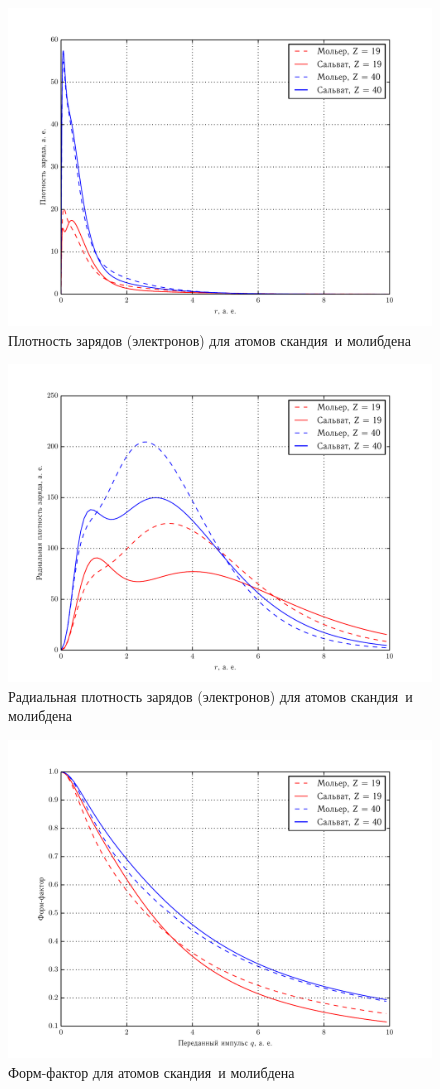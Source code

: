 \documentclass[10pt,pscyr]{hedlab}
\newcommand{\fiat}{скандия~}
\newcommand{\seat}{молибдена~}
\begin{document}
  \begin{figure}[h!]
    \centering
    \includegraphics[width=.7\textwidth]{density}
    \caption{Плотность зарядов (электронов) для атомов
      \fiat и \seat}
    \label{fig:density}
  \end{figure}

  \begin{figure}[h!]
    \centering
    \includegraphics[width=.7\textwidth]{radial_density}
    \caption{Радиальная плотность зарядов (электронов)
      для атомов \fiat и \seat}
    \label{fig:radial}
  \end{figure}
  
  \begin{figure}[h!]
    \centering
    \includegraphics[width=.7\textwidth]{form-factor}
    \caption{Форм-фактор для атомов \fiat и \seat}
    \label{fig:factor}
  \end{figure}
    
\end{document}

